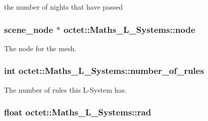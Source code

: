the number of nights that have passed 

\hypertarget{classoctet_1_1_maths___l___systems_ab7bffab6b7ca8de169cccc0dc999a130}{
\subsubsection[{node}]{\setlength{\rightskip}{0pt plus 5cm}scene\+\_\+node $\ast$ octet\+::\+Maths\+\_\+\+L\+\_\+\+Systems\+::node\hspace{0.3cm}{\ttfamily [private]}}}\label{classoctet_1_1_maths___l___systems_ab7bffab6b7ca8de169cccc0dc999a130}


The node for the mesh. 

\hypertarget{classoctet_1_1_maths___l___systems_af66610095ffa2515df4b7a821783792d}{
\subsubsection[{number\+\_\+of\+\_\+rules}]{\setlength{\rightskip}{0pt plus 5cm}int octet\+::\+Maths\+\_\+\+L\+\_\+\+Systems\+::number\+\_\+of\+\_\+rules\hspace{0.3cm}{\ttfamily [private]}}}\label{classoctet_1_1_maths___l___systems_af66610095ffa2515df4b7a821783792d}


The number of rules this L-\/\+System has. 

\hypertarget{classoctet_1_1_maths___l___systems_a3ffafcbe960edcaf6255cc3be7fc10af}{
\subsubsection[{rad}]{\setlength{\rightskip}{0pt plus 5cm}float octet\+::\+Maths\+\_\+\+L\+\_\+\+Systems\+::rad\hspace{0.3cm}{\ttfamily [private]}}}\label{classoctet_1_1_maths___l___systems_a3ffafcbe960edcaf6255cc3be7fc10af}


